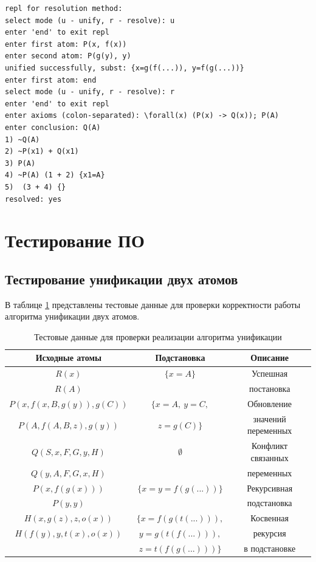 \begin{verbatim}
repl for resolution method:
select mode (u - unify, r - resolve): u
enter 'end' to exit repl
enter first atom: P(x, f(x))
enter second atom: P(g(y), y)
unified successfully, subst: {x=g(f(...)), y=f(g(...))}
enter first atom: end
select mode (u - unify, r - resolve): r
enter 'end' to exit repl
enter axioms (colon-separated): \forall(x) (P(x) -> Q(x)); P(A)
enter conclusion: Q(A)
1) ~Q(A)
2) ~P(x1) + Q(x1)
3) P(A)
4) ~P(A) (1 + 2) {x1=A}
5)  (3 + 4) {}
resolved: yes
\end{verbatim}

\clearpage

\section{Тестирование ПО}

\subsection{Тестирование унификации двух атомов}

В таблице \ref{tab:unify} представлены тестовые данные для проверки корректности работы алгоритма унификации двух атомов.

\begin{table}[h!]
    \centering
    \caption{Тестовые данные для проверки реализации алгоритма унификации}
    \label{tab:unify}
    \begin{tabular}{|c|c|c|}
        \hline
        Исходные атомы & Подстановка & Описание \\
        \hline
        \hline
        $R(x)$ & $\{x=A\}$ & Успешная \\
        $R(A)$ & & постановка \\
        \hline
        $P(x, f(x, B, g(y)), g(C))$ & $\{x=A,~y=C,$ & Обновление \\
        $P(A, f(A, B, z), g(y))$ & $z=g(C)\}$ & значений переменных \\
        \hline
        $Q(S, x, F, G, y, H)$ & $\emptyset$ & Конфликт связанных \\
        $Q(y, A, F, G, x, H)$ & & переменных \\
        \hline
        $P(x, f(g(x)))$ & $\{x=y=f(g(...))\}$ & Рекурсивная \\
        $P(y, y)$ & & подстановка \\
        \hline
        $H(x, g(z), z, o(x))$ & $\{x=f(g(t(...))),$ & Косвенная \\
        $H(f(y), y, t(x), o(x))$ & $y=g(t(f(...))),$ & рекурсия \\
        & $z=t(f(g(...)))\}$ & в подстановке \\
        \hline 
    \end{tabular}
\end{table}

